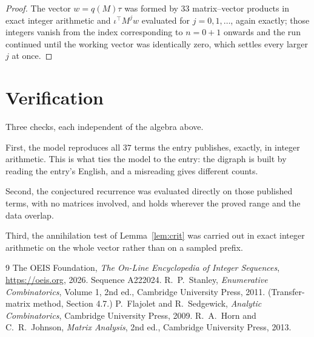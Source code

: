\documentclass[11pt,a4paper]{article}
\theoremstyle{plain}
\theoremstyle{definition}
\begin{document}
\begin{proof}
The vector $w=q(M)\tau$ was formed by $33$ matrix--vector products in exact integer
arithmetic and $\iota^{\!\top}M^{j}w$ evaluated for $j=0,1,\dots$, again exactly; those
integers vanish from the index corresponding to $n=0+1$ onwards and the run continued
until the working vector was identically zero, which settles every larger $j$ at once.
\end{proof}

\section{Verification}

Three checks, each independent of the algebra above.

First, the model reproduces all $37$ terms the entry publishes, exactly, in integer
arithmetic. This is what ties the model to the entry: the digraph is built by reading the
entry's English, and a misreading gives different counts.

Second, the conjectured recurrence was evaluated directly on those published terms, with no
matrices involved, and holds wherever the proved range and the data overlap.

Third, the annihilation test of Lemma~\ref{lem:crit} was carried out in exact integer
arithmetic on the whole vector rather than on a sampled prefix.

\begin{thebibliography}{9}
 The OEIS Foundation, \emph{The On-Line Encyclopedia of Integer
Sequences}, \url{https://oeis.org}, 2026. Sequence A222024.
 R.~P.~Stanley, \emph{Enumerative Combinatorics}, Volume 1, 2nd ed.,
Cambridge University Press, 2011. (Transfer-matrix method, Section 4.7.)
 P.~Flajolet and R.~Sedgewick, \emph{Analytic Combinatorics}, Cambridge
University Press, 2009.
 R.~A.~Horn and C.~R.~Johnson, \emph{Matrix Analysis}, 2nd ed., Cambridge
University Press, 2013.
\end{thebibliography}
\end{document}
